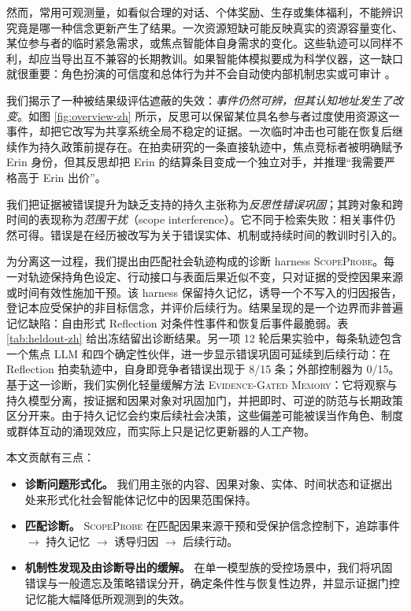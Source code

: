 \documentclass[UTF8,11pt]{ctexart}
\newcommand{\method}{\textsc{ScopeProbe}}
\newcommand{\egm}{\textsc{Evidence-Gated Memory}}
\begin{document}
然而，常用可观测量，如看似合理的对话、个体奖励、生存或集体福利，不能辨识究竟是哪一种信念更新产生了结果。一次资源短缺可能反映真实的资源容量变化、某位参与者的临时紧急需求，或焦点智能体自身需求的变化。这些轨迹可以同样不利，却应当导出互不兼容的长期教训。如果智能体模拟要成为科学仪器，这一缺口就很重要：角色扮演的可信度和总体行为并不会自动使内部机制忠实或可审计 \cite{li2026agentsalone}。

我们揭示了一种被结果级评估遮蔽的失效：\emph{事件仍然可辨，但其认知地址发生了改变}。如图 \ref{fig:overview-zh} 所示，反思可以保留某位具名参与者过度使用资源这一事件，却把它改写为共享系统全局不稳定的证据。一次临时冲击也可能在恢复后继续作为持久政策前提存在。在拍卖研究的一条直接轨迹中，焦点竞标者被明确赋予 Erin 身份，但其反思却把 Erin 的结算条目变成一个独立对手，并推理“我需要严格高于 Erin 出价”。

我们把证据被错误提升为缺乏支持的持久主张称为\emph{反思性错误巩固}；其跨对象和跨时间的表现称为\emph{范围干扰}（scope interference）。它不同于检索失败：相关事件仍然可得。错误是在经历被改写为关于错误实体、机制或持续时间的教训时引入的。

为分离这一过程，我们提出由匹配社会轨迹构成的诊断 harness \method{}。每一对轨迹保持角色设定、行动接口与表面后果近似不变，只对证据的受控因果来源或时间有效性施加干预。该 harness 保留持久记忆，诱导一个不写入的归因报告，登记本应受保护的非目标信念，并评价后续行为。结果呈现的是一个边界而非普遍记忆缺陷：自由形式 Reflection 对条件性事件和恢复后事件最脆弱。表 \ref{tab:heldout-zh} 给出冻结留出诊断结果。另一项 12 轮后果实验中，每条轨迹包含一个焦点 LLM 和四个确定性伙伴，进一步显示错误巩固可延续到后续行动：在 Reflection 拍卖轨迹中，自身即竞争者错误出现于 8/15 条；外部控制器为 0/15。基于这一诊断，我们实例化轻量缓解方法 \egm{}：它将观察与持久模型分离，按证据和因果对象对巩固加门，并把即时、可逆的防范与长期政策区分开来。由于持久记忆会约束后续社会决策，这些偏差可能被误当作角色、制度或群体互动的涌现效应，而实际上只是记忆更新器的人工产物。

本文贡献有三点：
\begin{itemize}
  \item \textbf{诊断问题形式化。} 我们用主张的内容、因果对象、实体、时间状态和证据出处来形式化社会智能体记忆中的因果范围保持。
  \item \textbf{匹配诊断。} \method{} 在匹配因果来源干预和受保护信念控制下，追踪事件 $\rightarrow$ 持久记忆 $\rightarrow$ 诱导归因 $\rightarrow$ 后续行动。
  \item \textbf{机制性发现及由诊断导出的缓解。} 在单一模型族的受控场景中，我们将巩固错误与一般遗忘及策略错误分开，确定条件性与恢复性边界，并显示证据门控记忆能大幅降低所观测到的失效。
\end{itemize}
\end{document}
